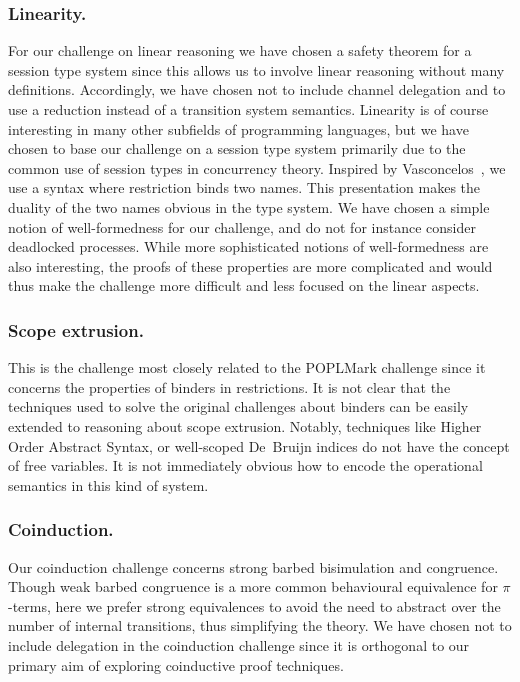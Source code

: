\documentclass[runningheads]{llncs}
\begin{document}
\subsubsection{Linearity.}
For our challenge on linear reasoning we have chosen a safety theorem
for a session type system since this allows us to involve linear
reasoning without many definitions. Accordingly, we have chosen not to
include channel delegation and to use a reduction instead of a
transition system semantics.
Linearity is of course interesting in many other subfields of programming languages, but we have chosen to base our challenge on a session type system primarily due to the common use of session types in concurrency theory.
Inspired by Vasconcelos~\cite{Vasconcelos2012}, we use a syntax where
restriction binds two names. This presentation makes the duality
of the two names obvious in the type system.
We have chosen a simple notion of well-formedness for our challenge,
and do not for instance consider deadlocked processes. While more
sophisticated notions of well-formedness are also interesting, the
proofs of these properties are more complicated and would thus make
the challenge more difficult and less focused on the linear
aspects.

\subsubsection{Scope extrusion.}
This is the challenge most closely related to the POPLMark
challenge since it concerns the properties of binders in restrictions.
It is not clear that the techniques used to solve the original challenges about binders can be easily extended to reasoning about scope extrusion.
Notably, techniques like Higher Order Abstract Syntax, or well-scoped
De\ Bruijn indices do not have the concept of free variables. It is
not immediately obvious how to encode the operational semantics in
this kind of system.


\subsubsection{Coinduction.}

Our coinduction challenge concerns strong barbed bisimulation and congruence.
Though weak barbed congruence is a more common behavioural equivalence for \(\pi\)-terms, here we prefer strong equivalences to avoid the need to abstract over the number of internal transitions, %
thus simplifying the theory.
We have chosen not to include delegation in the coinduction challenge since it is orthogonal to our primary aim of exploring coinductive proof techniques.
\end{document}
